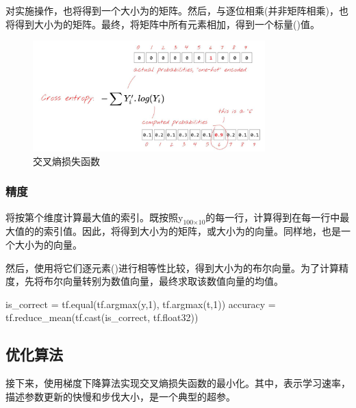 \begin{content}
对实施操作，也将得到一个大小为\code{[100, 10]}的矩阵。然后，与逐位相乘(并非矩阵相乘)，也将得到大小为\code{[100, 10]}的矩阵。最终，将矩阵中所有元素相加，得到一个标量()值。

\begin{figure}[H]
\centering
\includegraphics[width=0.8\textwidth]{figures/mnist-cross-entropy.png}
\caption{交叉熵损失函数}
 \label{fig:mnist-cross-entropy}
\end{figure}

\subsubsection{精度}

将按第个维度计算最大值的索引。既按照${{\text{y}}_{{\text{100}} \times {\text{10}}}}$的每一行，计算得到在每一行中最大值的的索引值。因此，将得到大小为\code{[100, 1]}的矩阵，或大小为的向量。同样地，也是一个大小为的向量。

然后，使用将它们逐元素()进行相等性比较，得到大小为的布尔向量。为了计算精度，先将布尔向量转别为数值向量，最终求取该数值向量的均值。

\begin{leftbar}
\begin{python}
is_correct = tf.equal(tf.argmax(y,1), tf.argmax(t,1))
accuracy = tf.reduce_mean(tf.cast(is_correct, tf.float32))
\end{python}
\end{leftbar}

\subsection{优化算法}

接下来，使用梯度下降算法实现交叉熵损失函数的最小化。其中，表示学习速率，描述参数更新的快慢和步伐大小，是一个典型的超参。


\end{content}
